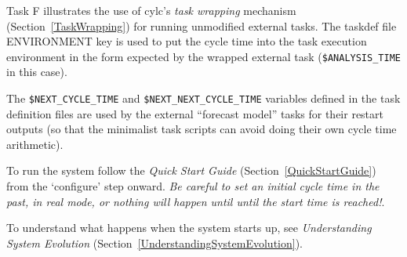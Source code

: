 Task F illustrates the use of cylc's {\em task wrapping} mechanism
(Section~\ref{TaskWrapping}) for running unmodified external tasks. 
The taskdef file ENVIRONMENT key is used to put the cycle time
into the task execution environment in the form expected by the wrapped
external task (\lstinline=$ANALYSIS_TIME= in this case). 

The \lstinline=$NEXT_CYCLE_TIME= and \lstinline=$NEXT_NEXT_CYCLE_TIME=
variables defined in the task definition files are used by the external
``forecast model'' tasks for their restart outputs (so that  
the minimalist task scripts can avoid doing their own cycle time
arithmetic).

To run the system follow the {\em Quick Start Guide}
(Section~\ref{QuickStartGuide}) from the `configure' step onward. 
{\em Be careful to set an initial cycle time in the past, in real mode,
or nothing will happen until until the start time is reached!}.

To understand what happens when the system starts up, see {\em
Understanding System Evolution}
(Section~\ref{UnderstandingSystemEvolution}).
